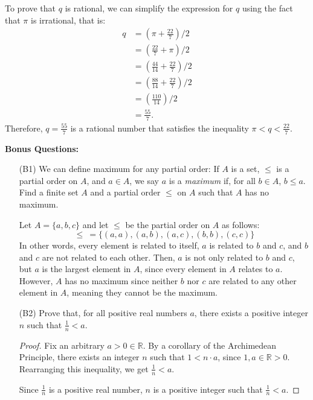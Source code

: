 \documentclass{article}
\begin{document}
\begin{enumerate}
                To prove that $q$ is rational, we can simplify the expression for $q$ using the fact that $\pi$ is irrational, that is:
                \begin{align*}
                    q &= (\pi + \frac{22}{7}) / 2 \\
                    &= (\frac{22}{7} + \pi) / 2 \\
                    &= (\frac{44}{14} + \frac{22}{7}) / 2 \\
                    &= (\frac{88}{14} + \frac{22}{7}) / 2 \\
                    &= (\frac{110}{14}) / 2 \\
                    &= \frac{55}{7}.
                \end{align*}
                Therefore, $q = \frac{55}{7}$ is a rational number that satisfies the inequality $\pi < q < \frac{22}{7}$.
            
    \end{enumerate}

    \newpage
    \textbf{Bonus Questions:}
    
    \begin{itemize}

        \item [(B1)] We can define maximum for any partial order: If $A$ is a set, $\leq$ is a partial order on $A$, and $a \in A$, we say $a$ is a \emph{maximum} if, for all $b \in A$, $b \le a$.  Find a finite set $A$ and a partial order $\leq$ on $A$ such that $A$ has no maximum.\\\par\quad
            Let $A = \{ a, b, c \}$ and let $\le$ be the partial order on $A$ as follows:
                \[
                    \le \ = \{ (a, a), (a, b), (a, c), (b, b), (c, c) \}
                \]
            In other words, every element is related to itself, $a$ is related to $b$ and $c$, and $b$ and $c$ are not related to each other. Then, $a$ is not only related to $b$ and $c$, but $a$ is the largest element in $A$, since every element in $A$ relates to $a$. However, $A$ has no maximum since neither $b$ nor $c$ are related to any other element in $A$, meaning they cannot be the maximum. 

        \item [(B2)] Prove that, for all positive real numbers $a$, there exists a positive integer $n$ such that $\frac{1}{n} < a$.
            \begin{proof}
                Fix an arbitrary $a > 0 \in\mathbb{R}$. By a corollary of the Archimedean Principle, there exists an integer $n$ such that $1 < n\cdot a$, since $1, a \in\mathbb{R} > 0$. Rearranging this inequality, we get $\frac{1}{n} < a$. \par

                Since $\frac{1}{n}$ is a positive real number, $n$ is a positive integer such that $\frac{1}{n} < a$.
            \end{proof}
    \end{itemize}
\end{document}
